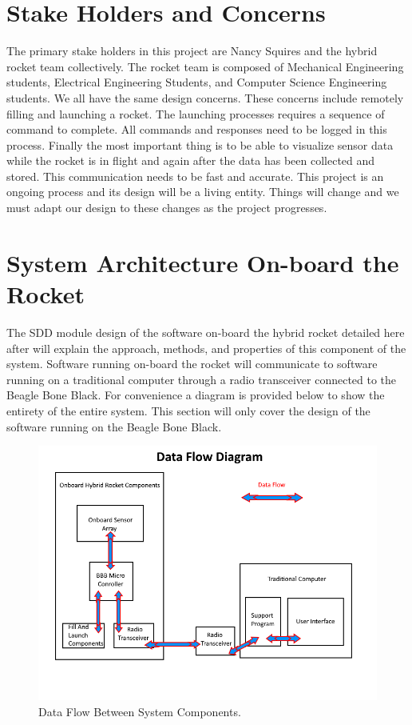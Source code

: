 \documentclass[10pt,draftclsnofoot,onecolumn,compsoc]{IEEEtran}
\begin{document}
\section{Stake Holders and Concerns}
The primary stake holders in this project are Nancy Squires and the hybrid rocket team collectively. The rocket team is composed of Mechanical Engineering students, Electrical Engineering Students, and Computer Science Engineering students. We all have the same design concerns. These concerns include remotely filling and launching a rocket. The launching processes requires a sequence of command to complete. All commands and responses need to be logged in this process. Finally the most important thing is to be able to visualize sensor data while the rocket is in flight and again after the data has been collected and stored. This communication needs to be fast and accurate. This project is an ongoing process and its design will be a living entity. Things will change and we must adapt our design to these changes as the project progresses.
\section{System Architecture On-board the Rocket }	
The SDD module design of the software on-board the hybrid rocket detailed here after will explain the approach, methods, and properties of this component of the system. Software running on-board the rocket will communicate to software running on a traditional computer through a radio transceiver connected to the Beagle Bone Black. For convenience a diagram is provided below to show the entirety of the entire system. This section will  only cover the design of the software running on the Beagle Bone Black. \par

\begin{figure}[!ht]
  \caption{Data Flow Between System Components.}
  \centering
	\includegraphics[scale=.85]{RocketBlockDiagram}
\end{figure}
\FloatBarrier
\end{document}
